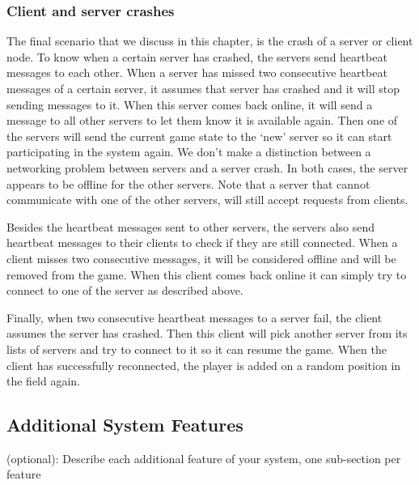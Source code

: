 \subsubsection{Client and server crashes}
\label{subsubsec:client_server_crashes}
The final scenario that we discuss in this chapter, is the crash of a server or client node. To know when a certain server has crashed, the servers send heartbeat messages to each other. When a server has missed two consecutive heartbeat messages of a certain server, it assumes that server has crashed and it will stop sending messages to it. When this server comes back online, it will send a message to all other servers to let them know it is available again. Then one of the servers will send the current game state to the `new' server so it can start participating in the system again. We don't make a distinction between a networking problem between servers and a server crash. In both cases, the server appears to be offline for the other servers. Note that a server that cannot communicate with one of the other servers, will still accept requests from clients.

Besides the heartbeat messages sent to other servers, the servers also send heartbeat messages to their clients to check if they are still connected. When a client misses two consecutive messages, it will be considered offline and will be removed from the game. When this client comes back online it can simply try to connect to one of the server as described above.

Finally, when two consecutive heartbeat messages to a server fail, the client assumes the server has crashed. Then this client will pick another server from its lists of servers and try to connect to it so it can resume the game. When the client has successfully reconnected, the player is added on a random position in the field again.

\subsection{Additional System Features}
\label{subsec:additional_features}
(optional): Describe each additional feature of your system, one sub-section per feature
 
